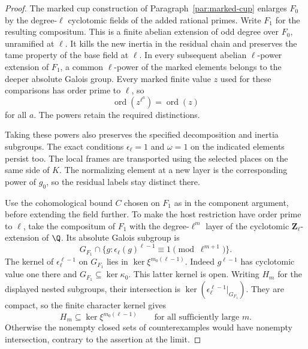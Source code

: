 \begin{proof}
The marked cup construction of
Paragraph~\ref{par:marked-cup} enlarges \(F_0\) by
the degree-\(\ell\) cyclotomic fields of the added
rational primes. Write \(F_1\) for the resulting
compositum. This is a finite abelian extension of
odd degree over \(F_0\), unramified at \(\ell\).
It kills the new inertia in the residual chain
and preserves the tame property of the base
field at \(\ell\). In every subsequent abelian
\(\ell\)-power extension of \(F_1\), a common
\(\ell\)-power of the marked elements belongs to
the deeper absolute Galois group. Every marked finite value \(z\) used for these comparisons
has order prime to \(\ell\), so
\[
             \operatorname{ord}(z^{\ell^a})=\operatorname{ord}(z)
\]
for all \(a\). The powers retain the required distinctions.

Taking these powers also preserves the specified decomposition and inertia subgroups. The exact
conditions \(\epsilon_\ell=1\) and \(\omega=1\)
on the indicated elements persist too. The local
frames are transported using the selected places
on the same side of \(K\). The normalizing element
at a new layer is the corresponding power of
\(g_0\), so the residual labels stay distinct there.

Use the cohomological bound \(C\) chosen on \(F_1\)
as in the component argument, before extending
the field further. To make the host restriction
have order prime to \(\ell\), take the compositum
of \(F_1\) with the degree-\(\ell^m\) layer of the
cyclotomic \(\mathbf Z_\ell\)-extension of \(\Q\).
Its absolute Galois subgroup is
\[
 G_{F_1}\cap\{g:\epsilon_\ell(g)^{\ell-1}
                        \equiv1\pmod{\ell^{m+1}}\}.
\]
The kernel of \(\epsilon_\ell^{\ell-1}\) on
\(G_{F_1}\) lies in \(\ker\xi^{m_0(\ell-1)}\).
Indeed \(g^{\ell-1}\) has cyclotomic value one
there and \(G_{F_1}\subseteq\ker\kappa_0\). This
latter kernel is open. Writing \(H_m\) for the displayed nested subgroups, their
intersection is \(\ker(\epsilon_\ell^{\ell-1}|_{G_{F_1}})\).
They are compact, so the finite character kernel gives
\[
         H_m\subseteq\ker\xi^{m_0(\ell-1)}
                  \qquad\text{for all sufficiently large }m .
\]
Otherwise the nonempty closed sets of counterexamples would have
nonempty intersection, contrary to the assertion at the limit.


\end{proof}
